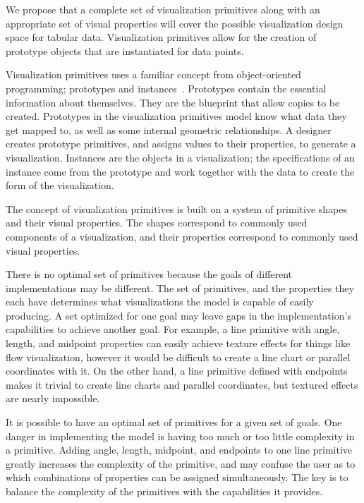 \label{model}

We propose that a complete set of visualization primitives along with an appropriate set of visual properties will cover the possible visualization design space for tabular data.
Visualization primitives allow for the creation of prototype objects that are instantiated for data points.

Visualization primitives uses a familiar concept from object-oriented programming; prototypes and instances~\cite{Taivalsaari1997}.
Prototypes contain the essential information about themselves.
They are the blueprint that allow copies to be created.
Prototypes in the visualization primitives model know what data they get mapped to, as well as some internal geometric relationships.
A designer creates prototype primitives, and assigns values to their properties, to generate a visualization.
Instances are the objects in a visualization; the specifications of an instance come from the prototype and work together with the data to create the form of the visualization.

\label{prototypes}

The concept of visualization primitives is built on a system of primitive shapes and their visual properties.
The shapes correspond to commonly used components of a visualization, and their properties correspond to commonly used visual properties.

There is no optimal set of primitives because the goals of different implementations may be different.
The set of primitives, and the properties they each have determines what visualizations the model is capable of easily producing.
A set optimized for one goal may leave gaps in the implementation's capabilities to achieve another goal.
For example, a line primitive with angle, length, and midpoint properties can easily achieve texture effects for things like flow visualization, however it would be difficult to create a line chart or parallel coordinates with it.
On the other hand, a line primitive defined with endpoints makes it trivial to create line charts and parallel coordinates, but textured effects are nearly impossible.

It is possible to have an optimal set of primitives for a given set of goals.
One danger in implementing the model is having too much or too little complexity in a primitive.
Adding angle, length, midpoint, and endpoints to one line primitive greatly increases the complexity of the primitive, and may confuse the user as to which combinations of properties can be assigned simultaneously.
The key is to balance the complexity of the primitives with the capabilities it provides.

